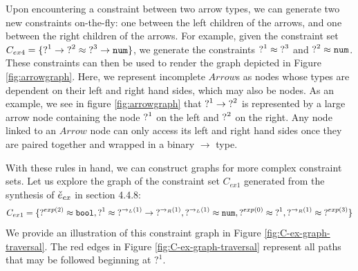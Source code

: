 
Upon encountering a constraint between two arrow types, we can generate two new constraints on-the-fly: one between the left children of the arrows, and one between the right children of the arrows. For example, given the constraint set $C_{ex4} = \{ \mathtt{?}^1 \rightarrow \mathtt{?}^2 \approx \mathtt{?}^3 \rightarrow \mathtt{num} \}$, we generate the constraints $\mathtt{?}^1 \approx \mathtt{?}^3$ and $\mathtt{?}^2 \approx \mathtt{num}$. These constraints can then be used to render the graph depicted in Figure \ref{fig:arrowgraph}. Here, we represent incomplete $Arrow$s as nodes whose types are dependent on their left and right hand sides, which may also be nodes. As an example, we see in figure \ref{fig:arrowgraph} that $\mathtt{?}^1 \rightarrow \mathtt{?}^2$ is represented by a large arrow node containing the node $\mathtt{?}^1$ on the left and $\mathtt{?}^2$ on the right. Any node linked to an $Arrow$ node can only access its left and right hand sides once they are paired together and wrapped in a binary $\rightarrow$ type. 

With these rules in hand, we can construct graphs for more complex constraint sets. Let us explore the graph of the constraint set $C_{ex1}$ generated from the synthesis of $\check{e}_{ex}$ in section 4.4.8:
$$C_{ex1} = \{ \operatorname{?}^{exp(2)} \approx \mathtt{bool}, \operatorname{?}^1 \approx \operatorname{?}^{\rightarrow_L(1)} \rightarrow \operatorname{?}^{\rightarrow_R(1)},  \operatorname{?}^{\rightarrow_L(1)} \approx \mathtt{num}, \operatorname{?}^{exp(0)} \approx \operatorname{?}^{1}, \operatorname{?}^{\rightarrow_R(1)} \approx \operatorname{?}^{exp(3)} \}$$
We provide an illustration of this constraint graph in Figure \ref{fig:C-ex-graph-traversal}. The red edges in Figure \ref{fig:C-ex-graph-traversal} represent all paths that may be followed beginning at $?^1$. 

